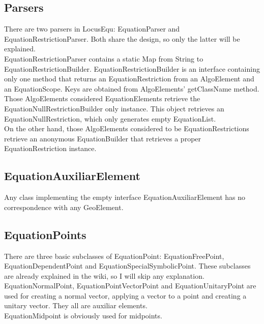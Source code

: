 \documentclass[12pt, oneside, a4paper]{article}
\begin{document}
\subsection{Parsers}
\label{ss:Parsers}

There are two parsers in LocusEqu: EquationParser and
EquationRestrictionParser. Both share the design, so only the latter
will be explained.\\

EquationRestrictionParser contains a static Map from String to
EquationRestrictionBuilder. EquationRestrictionBuilder is an interface
containing only one method that returns an EquationRestriction from an
AlgoElement and an EquationScope. Keys are obtained from AlgoElements'
getClassName method.\\

Those AlgoElements considered EquationElements retrieve the
EquationNullRestrictionBuilder only instance. This object retrieves an
EquationNullRestriction, which only generates empty EquationList.\\

On the other hand, those AlgoElements considered to be
EquationRestrictions retrieve an anonymous EquationBuilder that
retrieves a proper EquationRestriction instance.

\subsection{EquationAuxiliarElement}

Any class implementing the empty interface EquationAuxiliarElement has
no correspondence with any GeoElement.\\

\subsection{EquationPoints}

There are three basic subclasses of EquationPoint: EquationFreePoint,
EquationDependentPoint and EquationSpecialSymbolicPoint. These
subclasses are already explained in the wiki, so I will skip any
explanation.\\

EquationNormalPoint, EquationPointVectorPoint and EquationUnitaryPoint
are used for creating a normal vector, applying a vector to a point
and creating a unitary vector. They all are auxiliar elements.\\

EquationMidpoint is obviously used for midpoints.\\
\end{document}
